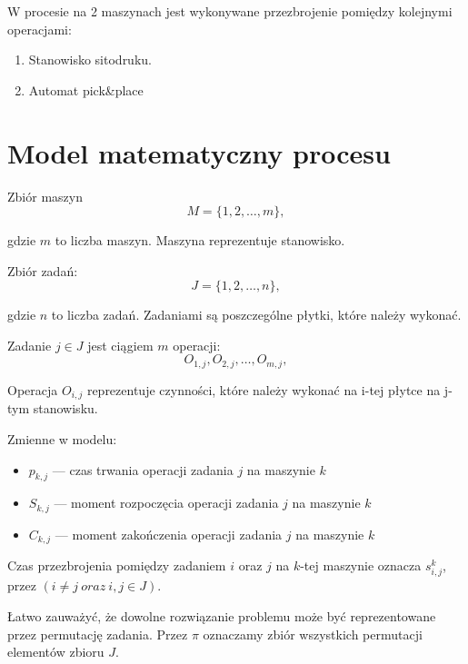 \newpage{}
W procesie na 2 maszynach jest wykonywane przezbrojenie pomiędzy kolejnymi operacjami:
\begin{enumerate}
	\item Stanowisko sitodruku.
	\item Automat pick\&place
\end{enumerate}

\section{Model matematyczny procesu}

\breakparagraph{}
Zbiór maszyn
\begin{equation}
	M=\lbrace 1, 2, \dots, m \rbrace,
\end{equation}

gdzie $m$ to liczba maszyn. Maszyna reprezentuje stanowisko.

\breakparagraph{}
Zbiór zadań:
\begin{equation}
	J=\lbrace 1, 2, \dots, n \rbrace,
\end{equation}

gdzie $n$ to liczba zadań. Zadaniami są poszczególne płytki, które należy wykonać.

\breakparagraph{}
Zadanie $j \in J$ jest ciągiem $m$ operacji:
\begin{equation}
	O_{1, j}, O_{2, j}, \dots, O_{m, j},
\end{equation}

Operacja $O_{i,j}$ reprezentuje czynności, które należy wykonać na i-tej płytce na j-tym stanowisku.

\breakparagraph{}
Zmienne w modelu:
\begin{itemize}
	\item $p_{k, j}$ --- czas trwania operacji zadania $j$ na maszynie $k$
	\item $S_{k, j}$ --- moment rozpoczęcia operacji zadania $j$ na maszynie $k$
	\item $C_{k, j}$ --- moment zakończenia operacji zadania $j$ na maszynie $k$
\end{itemize}

\breakparagraph{}
Czas przezbrojenia pomiędzy zadaniem $i$ oraz $j$ na $k$-tej maszynie oznacza $s_{i, j}^{k}$, przez $( i \neq j \ oraz\ i, j \in J )$.

\breakparagraph{}
Łatwo zauważyć, że dowolne rozwiązanie problemu może być reprezentowane przez permutację zadania. Przez $\pi$ oznaczamy zbiór wszystkich permutacji elementów zbioru $J$.

